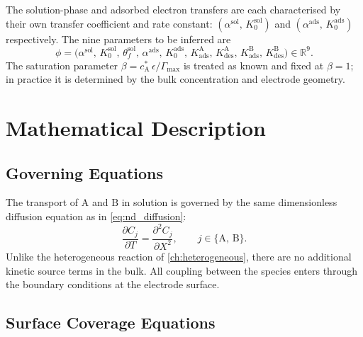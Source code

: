 The solution-phase and adsorbed electron transfers are each
characterised by their own transfer coefficient and rate constant:
$(\alpha^{\mathrm{sol}},\, K_0^{\mathrm{sol}})$ and
$(\alpha^{\mathrm{ads}},\, K_0^{\mathrm{ads}})$ respectively. The nine
parameters to be inferred are
\begin{equation}\label{eq:ads-params}
  \phi = \bigl(\alpha^{\mathrm{sol}},\, K_0^{\mathrm{sol}},\,
    \theta_f^{\mathrm{sol}},\,
    \alpha^{\mathrm{ads}},\, K_0^{\mathrm{ads}},\,
    K_{\mathrm{ads}}^{\mathrm{A}},\, K_{\mathrm{des}}^{\mathrm{A}},\,
    K_{\mathrm{ads}}^{\mathrm{B}},\, K_{\mathrm{des}}^{\mathrm{B}}
  \bigr) \in \mathbb{R}^9.
\end{equation}
The saturation parameter $\beta = c_\mathrm{A}^*\,\epsilon /
\Gamma_{\mathrm{max}}$ is treated as known and fixed at $\beta = 1$; in
practice it is determined by the bulk concentration and electrode
geometry.

\section{Mathematical Description}\label{sec:ads-maths}

\subsection{Governing Equations}

The transport of $\mathrm{A}$ and $\mathrm{B}$ in solution is governed
by the same dimensionless diffusion equation as in
\cref{eq:nd_diffusion}:
\begin{equation}\label{eq:ads-diffusion}
  \frac{\partial C_j}{\partial T} = \frac{\partial^2 C_j}{\partial X^2},
  \qquad j \in \{\mathrm{A},\,\mathrm{B}\}.
\end{equation}
Unlike the heterogeneous reaction of \cref{ch:heterogeneous}, there are
no additional kinetic source terms in the bulk. All coupling between the
species enters through the boundary conditions at the electrode surface.

\subsection{Surface Coverage Equations}

